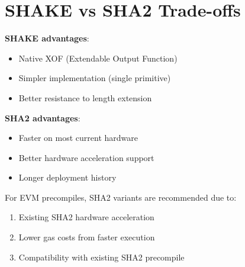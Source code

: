 \documentclass[11pt,a4paper]{article}
\begin{document}
\section{SHAKE vs SHA2 Trade-offs}

\textbf{SHAKE advantages}:
\begin{itemize}
    \item Native XOF (Extendable Output Function)
    \item Simpler implementation (single primitive)
    \item Better resistance to length extension
\end{itemize}

\textbf{SHA2 advantages}:
\begin{itemize}
    \item Faster on most current hardware
    \item Better hardware acceleration support
    \item Longer deployment history
\end{itemize}

For EVM precompiles, SHA2 variants are recommended due to:
\begin{enumerate}
    \item Existing SHA2 hardware acceleration
    \item Lower gas costs from faster execution
    \item Compatibility with existing SHA2 precompile
\end{enumerate}
\end{document}
